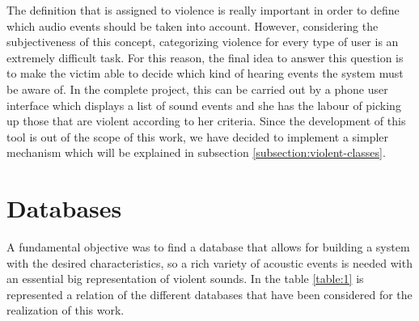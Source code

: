 	The definition that is assigned to violence is really important in order to define which audio events should be taken into account. However, considering the subjectiveness of this concept, categorizing violence for every type of user is an extremely difficult task. For this reason, the final idea to answer this question is to make the victim able to decide which kind of hearing events the system must be aware of. In the complete project, this can be carried out by a phone user interface which displays a list of sound events and she has the labour of picking up those that are violent according to her criteria. Since the development of this tool is out of the scope of this work, we have decided to implement a simpler mechanism which will be explained in subsection \ref{subsection:violent-classes}.
	
%
	

\section{Databases}

	A fundamental objective was to find a database that allows for building a system with the desired characteristics, so a rich variety of acoustic events is needed with an essential big representation of violent sounds. In the table \ref{table:1} is represented a relation of the different databases that have been considered for the realization of this work.
	
	
	
